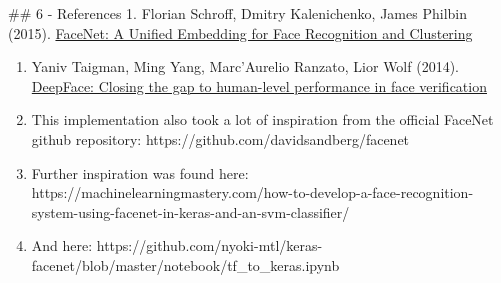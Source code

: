 \documentclass[11pt]{article}
\begin{document}
    \#\# 6 - References 1. Florian Schroff, Dmitry Kalenichenko, James
Philbin (2015). \href{https://arxiv.org/pdf/1503.03832.pdf}{FaceNet: A
Unified Embedding for Face Recognition and Clustering}

\begin{enumerate}
\def\labelenumi{\arabic{enumi}.}
\setcounter{enumi}{1}
\item
  Yaniv Taigman, Ming Yang, Marc'Aurelio Ranzato, Lior Wolf (2014).
  \href{https://research.fb.com/wp-content/uploads/2016/11/deepface-closing-the-gap-to-human-level-performance-in-face-verification.pdf}{DeepFace:
  Closing the gap to human-level performance in face verification}
\item
  This implementation also took a lot of inspiration from the official
  FaceNet github repository: https://github.com/davidsandberg/facenet
\item
  Further inspiration was found here:
  https://machinelearningmastery.com/how-to-develop-a-face-recognition-system-using-facenet-in-keras-and-an-svm-classifier/
\item
  And here:
  https://github.com/nyoki-mtl/keras-facenet/blob/master/notebook/tf\_to\_keras.ipynb
\end{enumerate}


    
    
    
\end{document}
